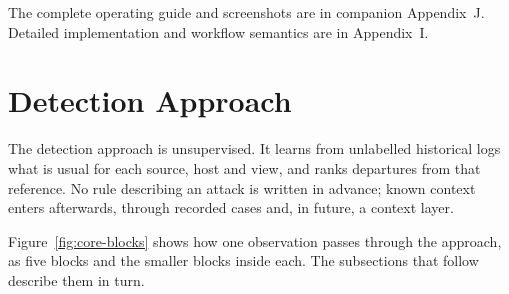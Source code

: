 \documentclass[11pt,a4paper]{article}
\begin{document}
The complete operating guide and screenshots are in companion Appendix~J. Detailed implementation and workflow semantics are in Appendix~I.

\clearpage
\section{Detection Approach}

The detection approach is unsupervised. It learns from unlabelled historical logs what is usual for each source, host and view, and ranks departures from that reference. No rule describing an attack is written in advance; known context enters afterwards, through recorded cases and, in future, a context layer.

Figure~\ref{fig:core-blocks} shows how one observation passes through the approach, as five blocks and the smaller blocks inside each. The subsections that follow describe them in turn.
\end{document}
